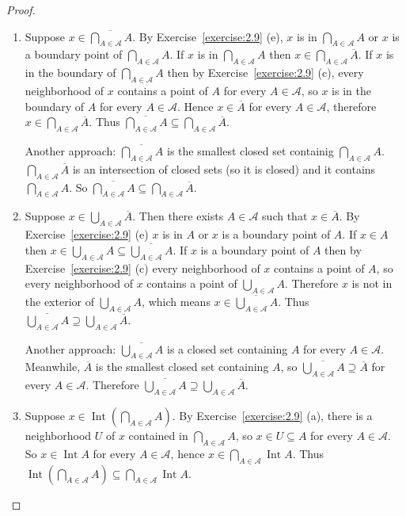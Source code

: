 \begin{proof}
	\begin{enumerate}[label={(\alph*)}]
		\item Suppose $x\in \overline{\bigcap_{A\in\mathscr{A}}A}$. By Exercise~\ref{exercise:2.9} (e), $x$ is in $\bigcap_{A\in\mathscr{A}}A$ or $x$ is a boundary point of $\bigcap_{A\in\mathscr{A}}A$. If $x$ is in $\bigcap_{A\in\mathscr{A}}A$ then $x\in \bigcap_{A\in\mathscr{A}}\overline{A}$. If $x$ is in the boundary of $\bigcap_{A\in\mathscr{A}}A$ then by Exercise~\ref{exercise:2.9} (c), every neighborhood of $x$ contains a point of $A$ for every $A\in\mathscr{A}$, so $x$ is in the boundary of $A$ for every $A\in\mathscr{A}$. Hence $x\in\overline{A}$ for every $A\in\mathscr{A}$, therefore $x\in \bigcap_{A\in\mathscr{A}}\overline{A}$. Thus $\overline{\bigcap_{A\in\mathscr{A}}A} \subseteq \bigcap_{A\in\mathscr{A}}\overline{A}$.

		      Another approach: $\displaystyle\overline{\bigcap_{A\in\mathscr{A}}A}$ is the smallest closed set containig $\displaystyle\bigcap_{A\in\mathscr{A}}A$. $\displaystyle\bigcap_{A\in\mathscr{A}}\overline{A}$ is an intersection of closed sets (so it is closed) and it contains $\displaystyle\bigcap_{A\in\mathscr{A}}{A}$. So $\displaystyle\overline{\bigcap_{A\in\mathscr{A}}A} \subseteq \bigcap_{A\in\mathscr{A}}\overline{A}$.
		\item Suppose $x\in \bigcup_{A\in\mathscr{A}}\overline{A}$. Then there exists $A\in\mathscr{A}$ such that $x\in \overline{A}$. By Exercise~\ref{exercise:2.9} (e) $x$ is in $A$ or $x$ is a boundary point of $A$. If $x\in A$ then $x\in \bigcup_{A\in\mathscr{A}}A \subseteq \overline{\bigcup_{A\in\mathscr{A}}A}$. If $x$ is a boundary point of $A$ then by Exercise~\ref{exercise:2.9} (c) every neighborhood of $x$ contains a point of $A$, so every neighborhood of $x$ contains a point of $\bigcup_{A\in\mathscr{A}}A$. Therefore $x$ is not in the exterior of $\bigcup_{A\in\mathscr{A}}A$, which means $x\in \overline{\bigcup_{A\in\mathscr{A}}A}$. Thus $\overline{\bigcup_{A\in\mathscr{A}}A} \supseteq \bigcup_{A\in\mathscr{A}}\overline{A}$.

		      Another approach: $\displaystyle\overline{\bigcup_{A\in\mathscr{A}}A}$ is a closed set containing $A$ for every $A\in\mathscr{A}$. Meanwhile, $\overline{A}$ is the smallest closed set containing $A$, so $\displaystyle\overline{\bigcup_{A\in\mathscr{A}}A} \supseteq \overline{A}$ for every $A\in\mathscr{A}$. Therefore $\overline{\bigcup_{A\in\mathscr{A}}A} \supseteq \bigcup_{A\in\mathscr{A}}\overline{A}$.
		\item Suppose $x\in \operatorname{Int}\left(\bigcap_{A\in\mathscr{A}}A\right)$. By Exercise~\ref{exercise:2.9} (a), there is a neighborhood $U$ of $x$ contained in $\bigcap_{A\in\mathscr{A}}A$, so $x\in U\subseteq A$ for every $A\in\mathscr{A}$. So $x\in\operatorname{Int} A$ for every $A\in\mathscr{A}$, hence $x\in\bigcap_{A\in\mathscr{A}}\operatorname{Int} A$. Thus $\operatorname{Int}\left(\bigcap_{A\in\mathscr{A}}A\right)\subseteq \bigcap_{A\in\mathscr{A}}\operatorname{Int}A$.


\end{enumerate}
\end{proof}
